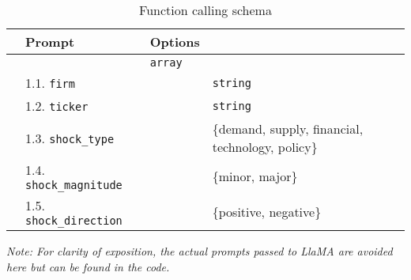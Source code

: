 \begin{table}[H]
\centering
\begin{threeparttable}
\caption{Function calling schema}
\begin{tabular}{l||L{4.1cm}|L{6.8cm}|L{5cm}|}
\hline 
{}
 & \textbf{Prompt} & \textbf{Options} \tabularnewline
\hline \Xhline{2\arrayrulewidth} 
 &  & \texttt{array} \tabularnewline
\hline
 & 1.1. \texttt{firm} &  & \texttt{string}
 \tabularnewline
{}   
 & 1.2. \texttt{ticker} &  & \texttt{string}
 \tabularnewline
{}   
 & 1.3. \texttt{shock\_type} &  & \{demand, supply, financial, \newline technology, policy\}\tabularnewline
{}   
 & 1.4. \texttt{shock\_magnitude} &  & \{minor, major\}\tabularnewline
{}   
 & 1.5. \texttt{shock\_direction} &  & \{positive, negative\}\tabularnewline 
{}   
\end{tabular}
\begin{tablenotes}
\footnotesize
\mx
\item \textit{Note: 
For clarity of exposition, the actual prompts passed to LlaMA are avoided here but can be found in the code. 
}
\end{tablenotes}
\label{tab:function_calling_structure}
\end{threeparttable}
\end{table}



